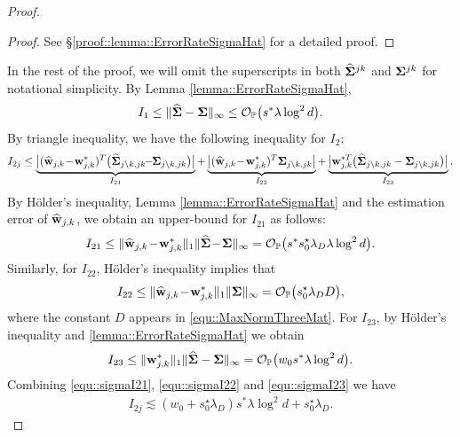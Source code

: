 \documentclass[twoside,11pt]{article}
\newcommand*{\hSigma}{\hat{\bSigma}}
\newcommand*{\hw}{\hat{\wb}}
\newcommand*{\sw}{\wb^*}
\begin{document}
\begin{proof}
\begin{lemma}
\end{lemma}
\begin{proof} 
See \S \ref{proof::lemma::ErrorRateSigmaHat} for a detailed proof.
\end{proof}

 In the rest of the proof, we will omit the superscripts in both $\hSigma^{jk}$ and $\bm{\Sigma}^{jk}$ for notational simplicity.
By  Lemma \ref{lemma::ErrorRateSigmaHat},
 \begin{align}\label{equ::SigmaI1Final}
I_1 \leq  \| \hSigma - \bSigma   \|_\infty  \leq \cO_{\PP}\bigl( s^*\lambda \log^2 d  \bigr).
\end{align}
By triangle inequality, we have the following inequality for $I_2:$
\begin{align*}
I_{2j} \leq \underbrace{ \bigl | (\hw_{j,k} \!-\! {\sw_{j,k}})^T \bigl(\hSigma_{j\setminus k,jk}\!\! -\!\! \bSigma_{j\setminus k,jk}\bigr)\bigr | }_{I_{21}} + \underbrace{ \bigl |(\hw_{j,k}\! -\! {\sw_{j,k}})^T  \bSigma_{j\setminus k,jk}\bigr | }_{I_{22}} + \underbrace{\bigl |{\sw_{j,k}}\!\!\!\!^T \bigl(\hSigma_{j\setminus k,jk} - \bSigma_{j\setminus k,jk}\bigr)\bigr |}_{I_{23}}.
\end{align*}
By H\"{o}lder's inequality, Lemma \ref{lemma::ErrorRateSigmaHat} and the estimation error of $\hw_{j,k}$, we obtain an upper-bound for $I_{21}$ as follows:
\begin{align}\label{equ::sigmaI21}
I_{21} \leq  \| \hw_{j,k} \! -\! {\sw_{j,k}} \|_1  \|\hSigma \! -\! \bSigma  \|_\infty = \cO_{\PP}\bigl (s^* s_0^\star\lambda_D  \lambda\log^2 d   \bigr).
\end{align}
Similarly, for $I_{22}$,  H\"{o}lder's inequality implies that
\begin{align}\label{equ::sigmaI22}
I_{22} \leq \| \hw_{j,k} \! -\! {\sw_{j,k}} \|_1  \| \bSigma  \|_\infty = \cO_{\PP}\bigl ( s_0^\star\lambda_D D \bigr ) ,
\end{align}
where the constant $D$ appears in \eqref{equ::MaxNormThreeMat}.
For $I_{23}$, by  H\"{o}lder's inequality and  \ref{lemma::ErrorRateSigmaHat} we obtain
\begin{align}\label{equ::sigmaI23}
I_{23} \leq   \| \sw_{j,k}  \|_1   \|\hSigma- \bSigma  \|_\infty = \cO_{\PP}\bigl (  w_0  s^* \lambda\log^2 d \bigr).
\end{align}
Combining \eqref{equ::sigmaI21}, \eqref{equ::sigmaI22} and \eqref{equ::sigmaI23} we have 
\begin{align}\label{equ::SigmaI2Final}
I_{2j}\lesssim (w_0 + s_0^\star \lambda_D ) s^* \lambda \log^2 d  + s_0^\star  \lambda_D.

\end{align}
\end{proof}
\end{document}
